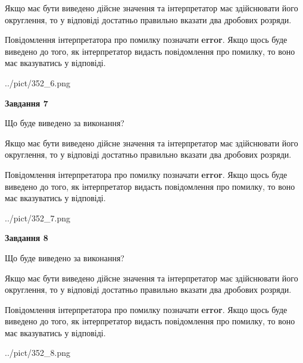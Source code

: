 \documentclass[12pt, ukrainian]{article}
\begin{document}
{\begin {Large}
Якщо має бути виведено дійсне значення та інтерпретатор має здійснювати його округлення, 
то у відповіді достатньо правильно вказати два дробових розряди.

Повідомлення інтерпретатора про помилку позначати \textbf{error}.
Якщо щось буде виведено до того, як інтерпретатор видасть повідомлення про помилку, 
то воно має вказуватись у відповіді. \par

\begin{center}
	{../pict/352_6.png}
\end{center}
\newpage

{\begin {center}\textbf{Завдання 7}\end {center}}\par
Що буде виведено за виконання? \par

Якщо має бути виведено дійсне значення та інтерпретатор має здійснювати його округлення, 
то у відповіді достатньо правильно вказати два дробових розряди.

Повідомлення інтерпретатора про помилку позначати \textbf{error}.
Якщо щось буде виведено до того, як інтерпретатор видасть повідомлення про помилку, 
то воно має вказуватись у відповіді. \par

\begin{center}
	{../pict/352_7.png}
\end{center}
\newpage

{\begin {center}\textbf{Завдання 8}\end {center}}\par
Що буде виведено за виконання? \par

Якщо має бути виведено дійсне значення та інтерпретатор має здійснювати його округлення, 
то у відповіді достатньо правильно вказати два дробових розряди.

Повідомлення інтерпретатора про помилку позначати \textbf{error}.
Якщо щось буде виведено до того, як інтерпретатор видасть повідомлення про помилку, 
то воно має вказуватись у відповіді. \par

\begin{center}
	{../pict/352_8.png}
\end{center}
\newpage


\end{Large}}
\end{document}
